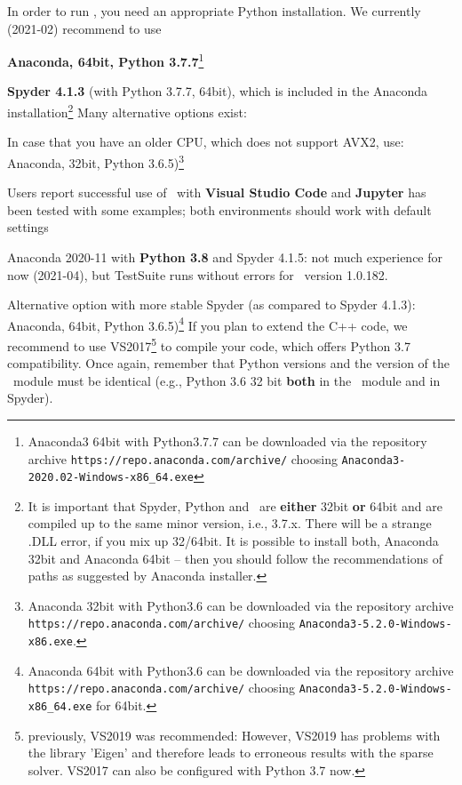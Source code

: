 In order to run \codeName , you need an appropriate Python installation.
We currently (2021-02) recommend to use
\bi
  \item {\bf Anaconda, 64bit, Python 3.7.7}\footnote{Anaconda3 64bit with Python3.7.7 can be downloaded via the repository archive \texttt{https://repo.anaconda.com/archive/} choosing \texttt{Anaconda3-2020.02-Windows-x86\_64.exe}}
	\item {\bf Spyder 4.1.3} (with Python 3.7.7, 64bit), which is included in the Anaconda installation\footnote{It is important that Spyder, Python and \codeName\  are {\bf either} 32bit {\bf or} 64bit and are compiled up to the same minor version, i.e., 3.7.x. 
	There will be a strange .DLL error, if you mix up 32/64bit. It is possible to install both, Anaconda 32bit and Anaconda 64bit -- then you should follow the recommendations of paths as suggested by Anaconda installer.}
\ei
Many alternative options exist:
\bi
  \item In case that you have an older CPU, which does not support AVX2, use: Anaconda, 32bit, Python 3.6.5)\footnote{Anaconda 32bit with Python3.6 can be downloaded via the repository archive \texttt{https://repo.anaconda.com/archive/} choosing \texttt{Anaconda3-5.2.0-Windows-x86.exe}.}
	\item Users report successful use of \codeName\ with {\bf Visual Studio Code} and {\bf Jupyter} has been tested with some examples; both environments should work with default settings
	\item Anaconda 2020-11 with {\bf Python 3.8} and Spyder 4.1.5: not much experience for now (2021-04), but TestSuite runs without errors for \codeName\ version 1.0.182.
  \item Alternative option with more stable Spyder (as compared to Spyder 4.1.3): Anaconda, 64bit, Python 3.6.5)\footnote{Anaconda 64bit with Python3.6 can be downloaded via the repository archive \texttt{https://repo.anaconda.com/archive/} choosing \texttt{Anaconda3-5.2.0-Windows-x86\_64.exe} for 64bit.}
\ei
If you plan to extend the C++ code, we recommend to use VS2017\footnote{previously, VS2019 was recommended: However, VS2019 has problems with the library 'Eigen' and therefore leads to erroneous results with the sparse solver. VS2017 can also be configured with Python 3.7 now.} to compile your code, which offers Python 3.7 compatibility.
Once again, remember that Python versions and the version of the \codeName\ module must be identical (e.g., Python 3.6 32 bit {\bf both} in the \codeName\ module and in Spyder).

